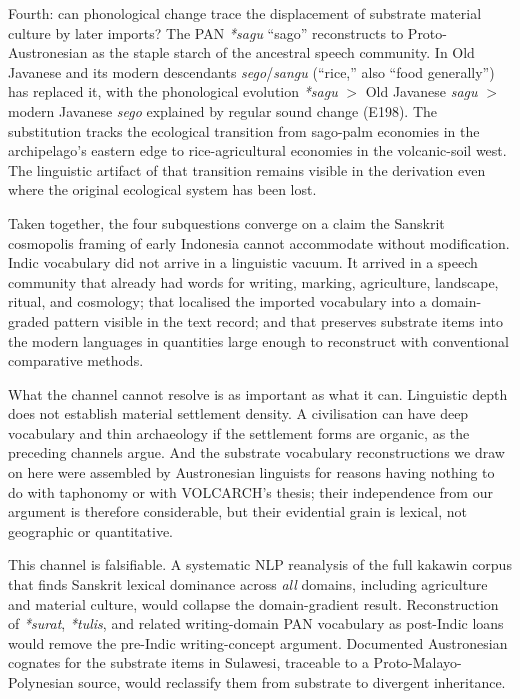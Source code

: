 \documentclass[12pt,a4paper]{article}
\begin{document}
Fourth: can phonological change trace the displacement of substrate material culture by later imports? The PAN \textit{*sagu} ``sago'' reconstructs to Proto-Austronesian as the staple starch of the ancestral speech community. In Old Javanese and its modern descendants \textit{sego}/\textit{sangu} (``rice,'' also ``food generally'') has replaced it, with the phonological evolution \textit{*sagu} $>$ Old Javanese \textit{sagu} $>$ modern Javanese \textit{sego} explained by regular sound change (E198). The substitution tracks the ecological transition from sago-palm economies in the archipelago's eastern edge to rice-agricultural economies in the volcanic-soil west. The linguistic artifact of that transition remains visible in the derivation even where the original ecological system has been lost.

Taken together, the four subquestions converge on a claim the Sanskrit cosmopolis framing of early Indonesia cannot accommodate without modification. Indic vocabulary did not arrive in a linguistic vacuum. It arrived in a speech community that already had words for writing, marking, agriculture, landscape, ritual, and cosmology; that localised the imported vocabulary into a domain-graded pattern visible in the text record; and that preserves substrate items into the modern languages in quantities large enough to reconstruct with conventional comparative methods.

What the channel cannot resolve is as important as what it can. Linguistic depth does not establish material settlement density. A civilisation can have deep vocabulary and thin archaeology if the settlement forms are organic, as the preceding channels argue. And the substrate vocabulary reconstructions we draw on here were assembled by Austronesian linguists for reasons having nothing to do with taphonomy or with VOLCARCH's thesis; their independence from our argument is therefore considerable, but their evidential grain is lexical, not geographic or quantitative.

This channel is falsifiable. A systematic NLP reanalysis of the full kakawin corpus that finds Sanskrit lexical dominance across \textit{all} domains, including agriculture and material culture, would collapse the domain-gradient result. Reconstruction of \textit{*surat}, \textit{*tulis}, and related writing-domain PAN vocabulary as post-Indic loans would remove the pre-Indic writing-concept argument. Documented Austronesian cognates for the substrate items in Sulawesi, traceable to a Proto-Malayo-Polynesian source, would reclassify them from substrate to divergent inheritance.
\end{document}
